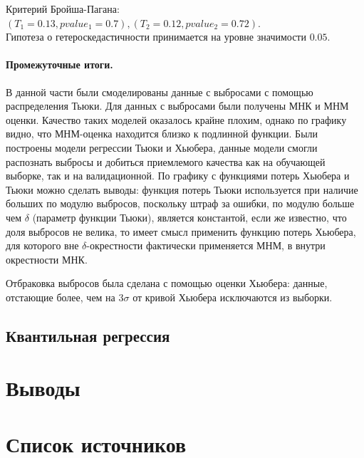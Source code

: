 \documentclass[a4paper,12pt]{article}
\begin{document}
Критерий Бройша-Пагана: $(T_1 = 0.13, pvalue_1 = 0.7), (T_2 = 0.12, pvalue_2 = 0.72)$.\\
Гипотеза о гетероскедастичности принимается на уровне значимости $0.05$.


\paragraph{Промежуточные итоги.\\}

В данной части были смоделированы данные с выбросами с помощью распределения Тьюки. Для данных с выбросами были получены МНК и МНМ оценки. Качество таких моделей оказалось крайне плохим, однако по графику видно, что МНМ-оценка находится близко к подлинной функции. Были построены модели регрессии Тьюки и Хьюбера, данные модели смогли распознать выбросы и добиться приемлемого качества как на обучающей выборке, так и на валидационной. По графику с функциями потерь Хьюбера и Тьюки можно сделать выводы: функция потерь Тьюки используется при наличие больших по модулю выбросов, поскольку штраф за ошибки, по модулю больше чем $\delta$ (параметр функции Тьюки), является константой, если же известно, что доля выбросов не велика, то имеет смысл применить функцию потерь Хьюбера, для которого вне $\delta$-окрестности фактически применяется МНМ, в внутри окрестности МНК.

Отбраковка выбросов была сделана с помощью оценки Хьюбера: данные, отстающие более, чем на $3\sigma$ от кривой Хьюбера исключаются из выборки.



\subsection{Квантильная регрессия}





\section{Выводы}

\section{Список источников}
\end{document}
